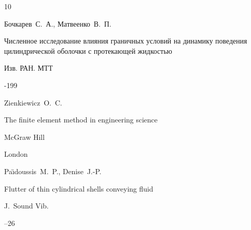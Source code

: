 \begin{thebibliography}{10}




\by Бочкарев~С.~А., Матвеенко~В.~П.

\paper Численное исследование влияния граничных условий на динамику поведения цилиндрической оболочки с протекающей жидкостью

\jour Изв. РАН. МТТ




-199















\by Zienkiewicz~O.~C.

\book The finite element method in engineering science


\publ McGraw Hill

\publaddr London





\by Pa\"{\i}doussis~M.~P., Denise~J.-P.

\paper Flutter of thin cylindrical shells conveying fluid

\jour J.~Sound Vib.



--26




\end{thebibliography}





